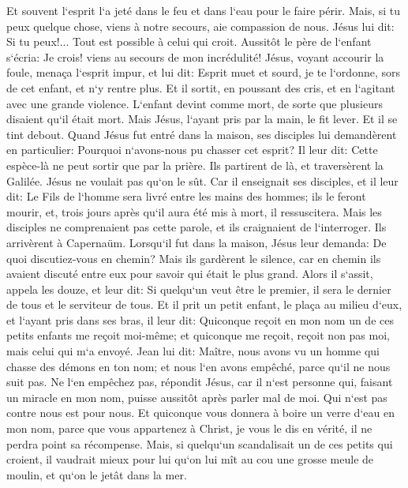 \verse Et souvent l`esprit l`a jeté dans le feu et dans l`eau pour le faire périr. Mais, si tu peux quelque chose, viens à notre secours, aie compassion de nous. 
\verse Jésus lui dit: Si tu peux!... Tout est possible à celui qui croit. 
\verse Aussitôt le père de l`enfant s`écria: Je crois! viens au secours de mon incrédulité! 
\verse Jésus, voyant accourir la foule, menaça l`esprit impur, et lui dit: Esprit muet et sourd, je te l`ordonne, sors de cet enfant, et n`y rentre plus. 
\verse Et il sortit, en poussant des cris, et en l`agitant avec une grande violence. L`enfant devint comme mort, de sorte que plusieurs disaient qu`il était mort. 
\verse Mais Jésus, l`ayant pris par la main, le fit lever. Et il se tint debout. 
\verse Quand Jésus fut entré dans la maison, ses disciples lui demandèrent en particulier: Pourquoi n`avons-nous pu chasser cet esprit? 
\verse Il leur dit: Cette espèce-là ne peut sortir que par la prière. 
\verse Ils partirent de là, et traversèrent la Galilée. Jésus ne voulait pas qu`on le sût. 
\verse Car il enseignait ses disciples, et il leur dit: Le Fils de l`homme sera livré entre les mains des hommes; ils le feront mourir, et, trois jours après qu`il aura été mis à mort, il ressuscitera. 
\verse Mais les disciples ne comprenaient pas cette parole, et ils craignaient de l`interroger. 
\verse Ils arrivèrent à Capernaüm. Lorsqu`il fut dans la maison, Jésus leur demanda: De quoi discutiez-vous en chemin? 
\verse Mais ils gardèrent le silence, car en chemin ils avaient discuté entre eux pour savoir qui était le plus grand. 
\verse Alors il s`assit, appela les douze, et leur dit: Si quelqu`un veut être le premier, il sera le dernier de tous et le serviteur de tous. 
\verse Et il prit un petit enfant, le plaça au milieu d`eux, et l`ayant pris dans ses bras, il leur dit: 
\verse Quiconque reçoit en mon nom un de ces petits enfants me reçoit moi-même; et quiconque me reçoit, reçoit non pas moi, mais celui qui m`a envoyé. 
\verse Jean lui dit: Maître, nous avons vu un homme qui chasse des démons en ton nom; et nous l`en avons empêché, parce qu`il ne nous suit pas. 
\verse Ne l`en empêchez pas, répondit Jésus, car il n`est personne qui, faisant un miracle en mon nom, puisse aussitôt après parler mal de moi. 
\verse Qui n`est pas contre nous est pour nous. 
\verse Et quiconque vous donnera à boire un verre d`eau en mon nom, parce que vous appartenez à Christ, je vous le dis en vérité, il ne perdra point sa récompense. 
\verse Mais, si quelqu`un scandalisait un de ces petits qui croient, il vaudrait mieux pour lui qu`on lui mît au cou une grosse meule de moulin, et qu`on le jetât dans la mer. 
